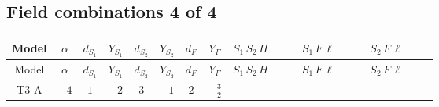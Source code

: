 \documentclass[8pt]{article}
\begin{document}
\begin{landscape}
\subsection*{Field combinations 4 of 4}
\begin{longtable}{@{}cccccccc >{\raggedright\arraybackslash}p{0.21\linewidth} >{\raggedright\arraybackslash}p{0.21\linewidth} >{\raggedright\arraybackslash}p{0.21\linewidth}@{}}
\toprule
Model & $\alpha$ & $d_{S_1}$ & $Y_{S_1}$ & $d_{S_2}$ & $Y_{S_2}$ & $d_F$ & $Y_F$ & $S_1\,S_2\,H$ & $S_1\,F\,\ell$ & $S_2\,F\,\ell$ \\
\midrule
\endfirsthead
\toprule
Model & $\alpha$ & $d_{S_1}$ & $Y_{S_1}$ & $d_{S_2}$ & $Y_{S_2}$ & $d_F$ & $Y_F$ & $S_1\,S_2\,H$ & $S_1\,F\,\ell$ & $S_2\,F\,\ell$ \\
\midrule
\endhead
T3-A & $-4$ & $1$ & $-2$ & $3$ & $-1$ & $2$ & $-\frac{3}{2}$ & \scriptsize\adjustbox{max width=\linewidth}{$\begin{gathered} +\overline{\lambda_5} S_{2,j_1} {\mathcal{I}_{LLS_1S_2}}^{*}_{a_1,a_2,j_1} H_{a_1}{}^{\dagger } H_{a_2}{}^{\dagger } S_1{}^{\dagger } \\ +H_{a_1} H_{a_2} S_1 \mathcal{I}_{T3,a_1,a_2,j_1} \lambda_5 S_{2,j_1}{}^{\dagger }\end{gathered}$} & \scriptsize\adjustbox{max width=\linewidth}{$\begin{gathered} +\overline{L_{a_1,i_1}}\, C\, P_R\, \overline{F_{j_1,r_1}}{}^T S_1 y_{1,i_1,r_1} \mathcal{I}_{y_1,a_1,j_1} \\ +\overline{y_{1,i_1,r_1}} L_{a_1,i_1}{}^T\, C\, P_L\, F_{j_1,r_1} {\mathcal{C}_{LS_1F}}^{*}_{a_1,j_1} S_1{}^{\dagger }\end{gathered}$} & \scriptsize\adjustbox{max width=\linewidth}{$\begin{gathered} +\overline{y_{2,i_1,r_1}} \overline{F_{j_1,r_1}}\, P_L\, L_{a_1,i_1} S_{2,j_1} {\mathcal{C}_{LS_2F}}^{*}_{a_1,j_1,j_1} \\ +\overline{L_{a_1,i_1}}\, P_R\, F_{j_1,r_1} y_{2,i_1,r_1} \mathcal{I}_{y_2,a_1,j_1,j_1} S_{2,j_1}{}^{\dagger }\end{gathered}$} \\
\midrule
\bottomrule
\end{longtable}
\end{landscape}
\end{document}
